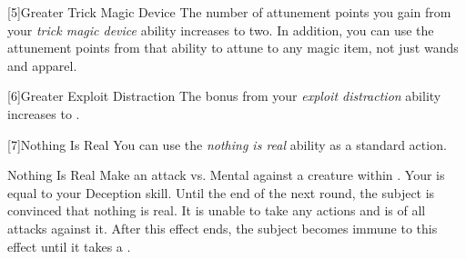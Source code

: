         [5]{Greater Trick Magic Device} The number of attunement points you gain from your \textit{trick magic device} ability increases to two.
        In addition, you can use the attunement points from that ability to attune to any magic item, not just wands and apparel.

        [6]{Greater Exploit Distraction} The bonus from your \textit{exploit distraction} ability increases to .

        [7]{Nothing Is Real} You can use the \textit{nothing is real} ability as a standard action.
        \begin{freeability}{Nothing Is Real}
            \rankline
            Make an attack vs. Mental against a creature within \shortrange.
            Your  is equal to your Deception skill.
            \hit Until the end of the next round, the subject is convinced that nothing is real.
            It is unable to take any actions and is \unaware of all attacks against it.
            After this effect ends, the subject becomes immune to this effect until it takes a .
        \end{freeability}

\newpage
